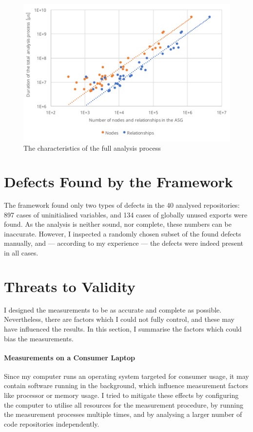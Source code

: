 \begin{figure}[!p]
	\centerfloat
	\includegraphics[width=\textwidth-1cm,clip]{figures/measurement-totaltime-nodes-relationships.pdf}
	\caption{The characteristics of the full analysis process}
	\label{fig:measurement-totaltime-nodes-relationships}
\end{figure}


\section{Defects Found by the Framework}

The framework found only two types of defects in the 40 analysed repositories: 897 cases of uninitialised variables, and 134 cases of globally unused exports were found. As the analysis is neither sound, nor complete, these numbers can be inaccurate. However, I inspected a randomly chosen subset of the found defects manually, and — according to my experience — the defects were indeed present in all cases.


\section{Threats to Validity}

I designed the measurements to be as accurate and complete as possible. Nevertheless, there are factors which I could not fully control, and these may have influenced the results. In this section, I summarise the factors which could bias the measurements.


\paragraph{Measurements on a Consumer Laptop}
Since my computer runs an operating system targeted for consumer usage, it may contain software running in the background, which influence measurement factors like processor or memory usage. I tried to mitigate these effects by configuring the computer to utilise all resources for the measurement procedure, by running the measurement processes multiple times, and by analysing a larger number of code repositories independently.


